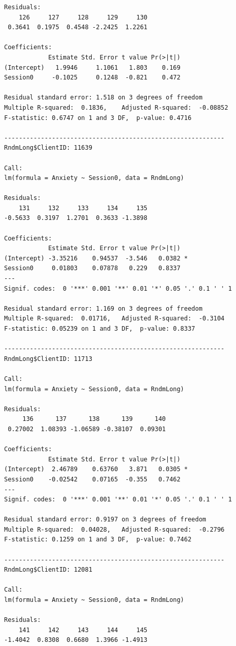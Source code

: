 \documentclass[
  english,
]{book}
\begin{document}
\begin{verbatim}
Residuals:
    126     127     128     129     130 
 0.3641  0.1975  0.4548 -2.2425  1.2261 

Coefficients:
            Estimate Std. Error t value Pr(>|t|)
(Intercept)   1.9946     1.1061   1.803    0.169
Session0     -0.1025     0.1248  -0.821    0.472

Residual standard error: 1.518 on 3 degrees of freedom
Multiple R-squared:  0.1836,    Adjusted R-squared:  -0.08852 
F-statistic: 0.6747 on 1 and 3 DF,  p-value: 0.4716

------------------------------------------------------------ 
RndmLong$ClientID: 11639

Call:
lm(formula = Anxiety ~ Session0, data = RndmLong)

Residuals:
    131     132     133     134     135 
-0.5633  0.3197  1.2701  0.3633 -1.3898 

Coefficients:
            Estimate Std. Error t value Pr(>|t|)  
(Intercept) -3.35216    0.94537  -3.546   0.0382 *
Session0     0.01803    0.07878   0.229   0.8337  
---
Signif. codes:  0 '***' 0.001 '**' 0.01 '*' 0.05 '.' 0.1 ' ' 1

Residual standard error: 1.169 on 3 degrees of freedom
Multiple R-squared:  0.01716,   Adjusted R-squared:  -0.3104 
F-statistic: 0.05239 on 1 and 3 DF,  p-value: 0.8337

------------------------------------------------------------ 
RndmLong$ClientID: 11713

Call:
lm(formula = Anxiety ~ Session0, data = RndmLong)

Residuals:
     136      137      138      139      140 
 0.27002  1.08393 -1.06589 -0.38107  0.09301 

Coefficients:
            Estimate Std. Error t value Pr(>|t|)  
(Intercept)  2.46789    0.63760   3.871   0.0305 *
Session0    -0.02542    0.07165  -0.355   0.7462  
---
Signif. codes:  0 '***' 0.001 '**' 0.01 '*' 0.05 '.' 0.1 ' ' 1

Residual standard error: 0.9197 on 3 degrees of freedom
Multiple R-squared:  0.04028,   Adjusted R-squared:  -0.2796 
F-statistic: 0.1259 on 1 and 3 DF,  p-value: 0.7462

------------------------------------------------------------ 
RndmLong$ClientID: 12081

Call:
lm(formula = Anxiety ~ Session0, data = RndmLong)

Residuals:
    141     142     143     144     145 
-1.4042  0.8308  0.6680  1.3966 -1.4913 


\end{verbatim}
\end{document}
